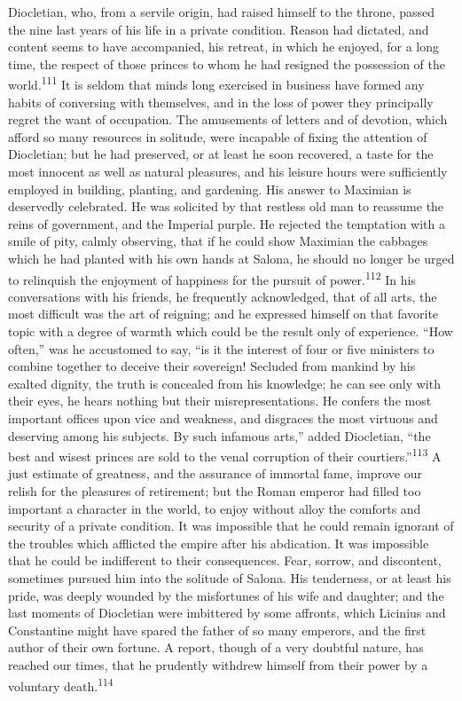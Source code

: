Diocletian, who, from a servile origin, had raised himself to the
throne, passed the nine last years of his life in a private
condition. Reason had dictated, and content seems to have
accompanied, his retreat, in which he enjoyed, for a long time,
the respect of those princes to whom he had resigned the
possession of the world.\textsuperscript{111} It is seldom that minds long
exercised in business have formed any habits of conversing with
themselves, and in the loss of power they principally regret the
want of occupation. The amusements of letters and of devotion,
which afford so many resources in solitude, were incapable of
fixing the attention of Diocletian; but he had preserved, or at
least he soon recovered, a taste for the most innocent as well as
natural pleasures, and his leisure hours were sufficiently
employed in building, planting, and gardening. His answer to
Maximian is deservedly celebrated. He was solicited by that
restless old man to reassume the reins of government, and the
Imperial purple. He rejected the temptation with a smile of pity,
calmly observing, that if he could show Maximian the cabbages
which he had planted with his own hands at Salona, he should no
longer be urged to relinquish the enjoyment of happiness for the
pursuit of power.\textsuperscript{112} In his conversations with his friends, he
frequently acknowledged, that of all arts, the most difficult was
the art of reigning; and he expressed himself on that favorite
topic with a degree of warmth which could be the result only of
experience. “How often,” was he accustomed to say, “is it the
interest of four or five ministers to combine together to deceive
their sovereign! Secluded from mankind by his exalted dignity,
the truth is concealed from his knowledge; he can see only with
their eyes, he hears nothing but their misrepresentations. He
confers the most important offices upon vice and weakness, and
disgraces the most virtuous and deserving among his subjects. By
such infamous arts,” added Diocletian, “the best and wisest
princes are sold to the venal corruption of their courtiers.”\textsuperscript{113}
A just estimate of greatness, and the assurance of immortal fame,
improve our relish for the pleasures of retirement; but the Roman
emperor had filled too important a character in the world, to
enjoy without alloy the comforts and security of a private
condition. It was impossible that he could remain ignorant of the
troubles which afflicted the empire after his abdication. It was
impossible that he could be indifferent to their consequences.
Fear, sorrow, and discontent, sometimes pursued him into the
solitude of Salona. His tenderness, or at least his pride, was
deeply wounded by the misfortunes of his wife and daughter; and
the last moments of Diocletian were imbittered by some affronts,
which Licinius and Constantine might have spared the father of so
many emperors, and the first author of their own fortune. A
report, though of a very doubtful nature, has reached our times,
that he prudently withdrew himself from their power by a
voluntary death.\textsuperscript{114}

